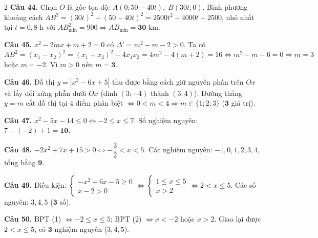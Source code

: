 \documentclass[12pt,a4paper]{article}
\begin{document}
\begin{multicols}{2}
\textbf{Câu 44.} Chọn $O$ là gốc tọa độ: $A(0; 50 - 40t),\; B(30t; 0)$. Bình phương khoảng cách $AB^2 = (30t)^2 + (50 - 40t)^2 = 2500t^2 - 4000t + 2500$, nhỏ nhất tại $t = 0{,}8\text{ h}$ với $AB_{\min}^2 = 900 \Rightarrow AB_{\min} = \mathbf{30}\text{ km}$.\par\vspace{3pt}

\textbf{Câu 45.} $x^2 - 2mx + m + 2 = 0$ có $\Delta' = m^2 - m - 2 > 0$. Ta có $AB^2 = (x_1 - x_2)^2 = (x_1+x_2)^2 - 4x_1x_2 = 4m^2 - 4(m+2) = 16 \Leftrightarrow m^2 - m - 6 = 0 \Rightarrow m = 3$ hoặc $m = -2$. Vì $m > 0$ nên $m = \mathbf{3}$.\par\vspace{3pt}

\textbf{Câu 46.} Đồ thị $y = |x^2 - 6x + 5|$ thu được bằng cách giữ nguyên phần trên $Ox$ và lấy đối xứng phần dưới $Ox$ (đỉnh $(3; -4)$ thành $(3; 4)$). Đường thẳng $y = m$ cắt đồ thị tại $4$ điểm phân biệt $\Leftrightarrow 0 < m < 4 \Rightarrow m \in \{1; 2; 3\}$ ($\mathbf{3}$ giá trị).\par\vspace{3pt}

\textbf{Câu 47.} $x^2 - 5x - 14 \le 0 \Leftrightarrow -2 \le x \le 7$. Số nghiệm nguyên: $7 - (-2) + 1 = \mathbf{10}$.\par\vspace{3pt}

\textbf{Câu 48.} $-2x^2 + 7x + 15 > 0 \Leftrightarrow -\dfrac{3}{2} < x < 5$. Các nghiệm nguyên: $-1, 0, 1, 2, 3, 4$, tổng bằng $\mathbf{9}$.\par\vspace{3pt}

\textbf{Câu 49.} Điều kiện: $\begin{cases} -x^2 + 6x - 5 \ge 0 \\ x - 2 > 0 \end{cases} \Leftrightarrow \begin{cases} 1 \le x \le 5 \\ x > 2 \end{cases} \Leftrightarrow 2 < x \le 5$. Các số nguyên: $3, 4, 5$ ($\mathbf{3}$ số).\par\vspace{3pt}

\textbf{Câu 50.} BPT (1) $\Leftrightarrow -2 \le x \le 5$; BPT (2) $\Leftrightarrow x < -2$ hoặc $x > 2$. Giao lại được $2 < x \le 5$, có $\mathbf{3}$ nghiệm nguyên ($3, 4, 5$).\par\vspace{3pt}


\end{multicols}
\end{document}
